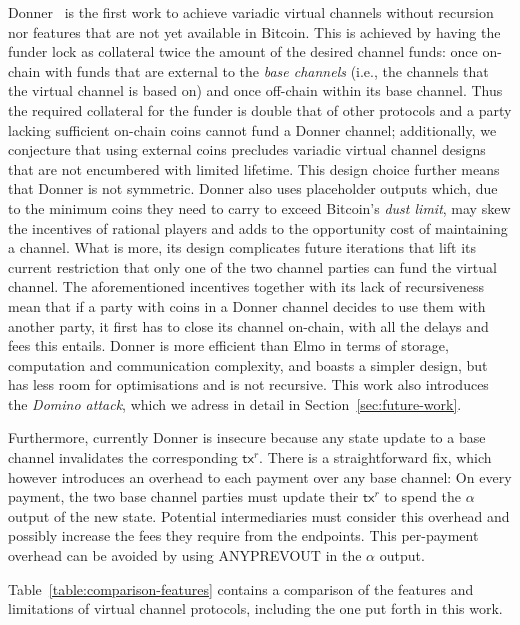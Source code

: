   Donner~\cite{donner} is the first work to achieve variadic
  virtual channels without recursion nor features that are not yet
  available in Bitcoin. This is achieved by having the funder lock as
  collateral twice the amount of the desired channel funds: once on-chain with
  funds that are external to the \emph{base channels} (i.e., the channels that the
  virtual channel is based on) and once off-chain within its base channel. Thus
  the required collateral for the funder is double that of other protocols and
  a party lacking sufficient on-chain coins cannot fund a Donner channel;
  additionally, we conjecture that using external coins precludes variadic
  virtual channel designs that are not encumbered with limited lifetime. This
  design choice further means that Donner is not symmetric. Donner also uses
  placeholder outputs which, due to the minimum coins they need to carry to
  exceed Bitcoin's \emph{dust limit}, may skew the incentives of rational players
  and adds to the
  opportunity cost of maintaining a channel. What is more, its design complicates
  future iterations that lift its current restriction that only one of the two
  channel parties can fund the virtual channel. The aforementioned incentives
  together with its lack of recursiveness mean that if a party with coins in a
  Donner channel decides to use them with another party, it first has to close
  its channel on-chain, with all the delays and fees this entails. Donner is
  more efficient than Elmo in terms of storage, computation and communication
  complexity, and boasts a simpler design, but has less room for optimisations
  and is not recursive. This work also introduces the \emph{Domino attack},
  which we adress in detail in Section~\ref{sec:future-work}.

  Furthermore, currently Donner is insecure because any state update to a base
  channel invalidates the corresponding $\mathsf{tx}^r$. There is a
  straightforward fix, which however introduces an overhead to each payment over
  any base channel: On every payment, the two base channel parties must update
  their $\mathsf{tx}^r$ to spend the $\alpha$ output of the new state. Potential
  intermediaries must consider this overhead and possibly increase the fees they
  require from the endpoints. This per-payment overhead can be avoided by using
  ANYPREVOUT in the $\alpha$ output.

  Table~\ref{table:comparison-features} contains a comparison of the
  features and limitations of virtual channel protocols, including the one put
  forth in this work.

